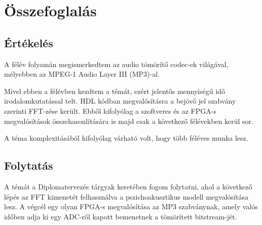 \documentclass[12pt, a4paper]{article}
\begin{document}
\section{Összefoglalás}

\subsection{Értékelés}
A félév folyamán megismerkedtem az audio tömörítő codec-ek világával, mélyebben az MPEG-1 Audio Layer III (MP3)-al.

Mivel ebben a félévben kezdtem a témát, ezért jelentős mennyiségű idő irodalomkutatással telt. HDL kódban megvalósításra a bejövő jel szabvány szerinti FFT-zése került.
Ebből kifolyólag a szoftveres és az FPGA-s megvalósítások összehasonlítására is majd csak a következő félévekben kerül sor. 

A téma komplexitásából kifolyólag várható volt, hogy több féléves munka lesz.


\subsection{Folytatás}
A témát a Diplomatervezés tárgyak keretében fogom folytatni, ahol a következő lépés az FFT kimenetét felhasználva a pszichoakusztikus modell megvalósítása lesz.
A végcél egy olyan FPGA-s megvalósítása az MP3 szabványnak, amely valós időben adja ki egy ADC-ről kapott bemenetnek a tömörített bitstream-jét.

\newpage
\printbibliography
\end{document}
